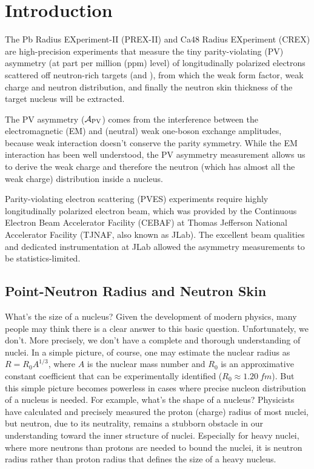 \chapter{Introduction}
The Pb Radius EXperiment-II (PREX-II) and Ca48 Radius EXperiment (CREX) are 
high-precision experiments that measure the tiny parity-violating (PV) asymmetry 
(at part per million (ppm) level) of longitudinally polarized electrons scattered 
off neutron-rich targets (\Pb and \Ca), from which the weak form factor, weak
charge and neutron distribution, and finally the
neutron skin thickness of the target nucleus will be extracted.

The PV asymmetry ($\mathcal{A}_{\text{PV}}$) comes from the interference between the 
electromagnetic (EM) and (neutral) weak one-boson exchange amplitudes, because weak 
interaction doesn't conserve the parity symmetry. While the EM 
interaction has been well understood, the PV asymmetry measurement allows 
us to derive the weak charge and therefore the neutron (which has almost all the 
weak charge) distribution inside a nucleus.

Parity-violating electron scattering (PVES) experiments require %
highly longitudinally polarized electron beam, which was provided by the 
Continuous Electron Beam Accelerator Facility (CEBAF) 
at Thomas Jefferson National Accelerator Facility (TJNAF, also known as JLab). 
The excellent beam qualities and dedicated instrumentation at JLab allowed 
the asymmetry measurements to be statistics-limited.

\section{Point-Neutron Radius and Neutron Skin}
What's the size of a nucleus? Given the development of modern physics, many people may
think there is a clear answer to this basic question. Unfortunately, we don't.
More precisely, we don't have a complete and thorough understanding of nuclei. In a 
simple picture, of course, one may estimate the nuclear radius as $R = R_0 A^{1/3}$, 
where $A$ is the nuclear mass number 
and $R_0$ is an approximative constant coefficient that can be experimentally 
identified ($R_0 \approx 1.20\ fm$). But this simple picture becomes powerless
in cases where precise nucleon distribution of a nucleus is needed. 
For example, what's the shape of a nucleus?
Physicists have calculated and precisely measured the proton (charge) radius of most nuclei,
but neutron, due to its neutrality, remains a stubborn obstacle in 
our understanding toward the inner structure of nuclei. Especially for heavy nuclei,
where more neutrons than protons are needed to bound the nuclei, it is neutron
radius rather than proton radius that defines the size of a heavy nucleus.

